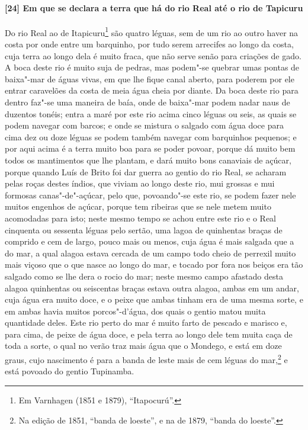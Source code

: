 \begin{linenumbers}
\paragraph{[24] Em que se declara a terra que há do rio Real até o rio de Tapicuru} \quad
Do rio Real ao de Itapicuru\footnote{ Em Varnhagen (1851 e 1879), ``Itapocurú''.} são
quatro léguas, sem de um rio ao outro haver na costa por onde entre um barquinho, por tudo
serem arrecifes ao longo da costa, cuja terra ao longo dela é muito fraca, que não serve
senão para criações de gado. A boca deste rio é muito suja de pedras, mas podem"-se quebrar
umas pontas de baixa"-mar de águas vivas, em que lhe fique canal aberto, para poderem por
ele entrar caravelões da costa de meia água cheia por diante. Da boca deste rio para
dentro faz"-se uma maneira de baía, onde de baixa"-mar podem nadar naus de duzentos tonéis;
entra a maré por este rio acima cinco léguas ou seis, as quais se podem navegar com
barcos; e onde se mistura o salgado com água doce para cima dez ou doze léguas se podem
também navegar com barquinhos pequenos; e por aqui acima é a terra muito boa para se poder
povoar, porque dá muito bem todos os mantimentos que lhe plantam, e dará muito bons
canaviais de açúcar, porque quando Luís de Brito foi dar guerra ao gentio do rio Real, se
acharam pelas roças destes índios, que viviam ao longo deste rio, mui grossas e mui
formosas canas"-de"-açúcar, pelo que, povoando"-se este rio, se podem fazer nele muitos
engenhos de açúcar, porque tem ribeiras que se nele metem muito acomodadas para isto;
neste mesmo tempo se achou entre este rio e o Real cinquenta ou sessenta léguas pelo
sertão, uma lagoa de quinhentas braças de comprido e cem de largo, pouco mais ou menos,
cuja água é mais salgada que a do mar, a qual alagoa estava cercada de um campo todo cheio
de perrexil muito mais viçoso que o que nasce ao longo do mar, e tocado por fora nos
beiços era tão salgado como se lhe dera o rocio do mar; neste mesmo campo afastado desta
alagoa quinhentas ou seiscentas braças estava outra alagoa, ambas em um andar, cuja água
era muito doce, e o peixe que ambas tinham era de uma mesma sorte, e em ambas havia muitos
porcos"-d'água, dos quais o gentio matou muita quantidade deles. Este rio perto do mar é
muito farto de pescado e marisco e, para cima, de peixe de água doce, e pela terra ao
longo dele tem muita caça de toda a sorte, o qual no verão traz mais água que o Mondego, e
está em doze graus, cujo nascimento é para a banda de leste mais de cem léguas do
mar,\footnote{ Na edição de 1851, ``banda de loeste'', e na de 1879, ``banda do loeste''.}
e está povoado do gentio Tupinamba.


\end{linenumbers}
